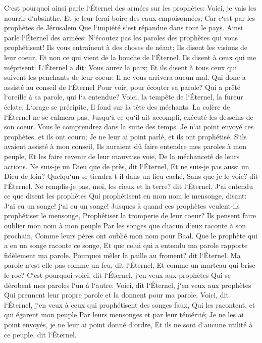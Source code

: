 \verse C`est pourquoi ainsi parle l`Éternel des armées sur les prophètes: Voici, je vais les nourrir d`absinthe, Et je leur ferai boire des eaux empoisonnées; Car c`est par les prophètes de Jérusalem Que l`impiété s`est répandue dans tout le pays. 
\verse Ainsi parle l`Éternel des armées: N`écoutez pas les paroles des prophètes qui vous prophétisent! Ils vous entraînent à des choses de néant; Ils disent les visions de leur coeur, Et non ce qui vient de la bouche de l`Éternel. 
\verse Ils disent à ceux qui me méprisent: L`Éternel a dit: Vous aurez la paix; Et ils disent à tous ceux qui suivent les penchants de leur coeur: Il ne vous arrivera aucun mal. 
\verse Qui donc a assisté au conseil de l`Éternel Pour voir, pour écouter sa parole? Qui a prêté l`oreille à sa parole, qui l`a entendue? 
\verse Voici, la tempête de l`Éternel, la fureur éclate, L`orage se précipite, Il fond sur la tête des méchants. 
\verse La colère de l`Éternel ne se calmera pas, Jusqu`à ce qu`il ait accompli, exécuté les desseins de son coeur. Vous le comprendrez dans la suite des temps. 
\verse Je n`ai point envoyé ces prophètes, et ils ont couru; Je ne leur ai point parlé, et ils ont prophétisé. 
\verse S`ils avaient assisté à mon conseil, Ils auraient dû faire entendre mes paroles à mon peuple, Et les faire revenir de leur mauvaise voie, De la méchanceté de leurs actions. 
\verse Ne suis-je un Dieu que de près, dit l`Éternel, Et ne suis-je pas aussi un Dieu de loin? 
\verse Quelqu`un se tiendra-t-il dans un lieu caché, Sans que je le voie? dit l`Éternel. Ne remplis-je pas, moi, les cieux et la terre? dit l`Éternel. 
\verse J`ai entendu ce que disent les prophètes Qui prophétisent en mon nom le mensonge, disant: J`ai eu un songe! j`ai eu un songe! 
\verse Jusques à quand ces prophètes veulent-ils prophétiser le mensonge, Prophétiser la tromperie de leur coeur? 
\verse Ils pensent faire oublier mon nom à mon peuple Par les songes que chacun d`eux raconte à son prochain, Comme leurs pères ont oublié mon nom pour Baal. 
\verse Que le prophète qui a eu un songe raconte ce songe, Et que celui qui a entendu ma parole rapporte fidèlement ma parole. Pourquoi mêler la paille au froment? dit l`Éternel. 
\verse Ma parole n`est-elle pas comme un feu, dit l`Éternel, Et comme un marteau qui brise le roc? 
\verse C`est pourquoi voici, dit l`Éternel, j`en veux aux prophètes Qui se dérobent mes paroles l`un à l`autre. 
\verse Voici, dit l`Éternel, j`en veux aux prophètes Qui prennent leur propre parole et la donnent pour ma parole. 
\verse Voici, dit l`Éternel, j`en veux à ceux qui prophétisent des songes faux, Qui les racontent, et qui égarent mon peuple Par leurs mensonges et par leur témérité; Je ne les ai point envoyés, je ne leur ai point donné d`ordre, Et ils ne sont d`aucune utilité à ce peuple, dit l`Éternel. 
